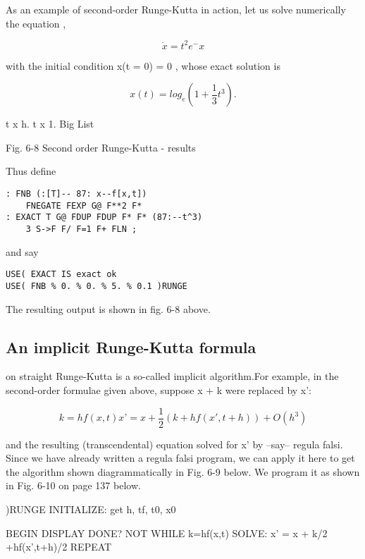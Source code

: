 As an example of second-order Runge-Kutta in action, let us solve numerically the equation ,

\begin{equation}
\dot{x} = t^2 e^-x
\end{equation}

with the initial condition x(t = 0) = 0 , whose exact solution is

\begin{equation}
x(t) =log_e(1 +\frac{1}{3}t^3).
\end{equation}

t x h. t x 1.
Big List

Fig. 6-8 Second order Runge-Kutta - results

Thus define

\begin{lstlisting}
: FNB (:[T]-- 87: x--f[x,t])
    FNEGATE FEXP G@ F**2 F*
: EXACT T G@ FDUP FDUP F* F* (87:--t^3)
    3 S->F F/ F=1 F+ FLN ;
\end{lstlisting}

and say

\begin{lstlisting}
USE( EXACT IS exact ok
USE( FNB % 0. % 0. % 5. % 0.1 )RUNGE
\end{lstlisting}

The resulting output is shown in fig. 6-8 above.

\subsection{An implicit Runge-Kutta formula}
 on straight Runge-Kutta is a so-called implicit algorithm.For example, in the second-order formulae given above, suppose x + k were replaced by x’:

\begin{equation}
k = hf(x,t)
x’ = x + \frac{1}{2}(k + hf(x',t+h)) + O(h^3)
\end{equation}

and the resulting (transcendental) equation solved for x’ by --say-- regula falsi. Since we have already written a regula falsi program, we can apply it here to get the algorithm shown diagrammatically in Fig. 6-9 below. We program it as shown in Fig. 6-10 on page 137 below.

)RUNGE
  INITIALIZE: get h, tf, t0, x0

  BEGIN DISPLAY
   DONE? NOT
  WHILE
   k=hf(x,t)
    SOLVE: x' = x + k/2 +hf(x’,t+h)/2
  REPEAT

